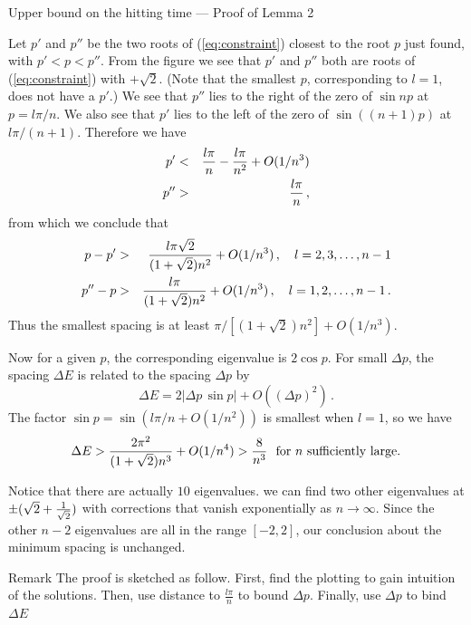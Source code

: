 \documentclass{beamer}
\newcommand{\<}{\langle}
\renewcommand{\>}{\rangle}
\newcommand{\be}{\begin{equation}}
\newcommand{\ee}{\end{equation}}
\newcommand{\bea}{\begin{eqnarray}}
\newcommand{\eea}{\end{eqnarray}}
\begin{document}
\begin{frame}[allowframebreaks]{Upper bound on the hitting time --- Proof of Lemma 2}
\framebreak

Let $p'$ and $p''$ be the two roots of (\ref{eq:constraint}) closest to
the root $p$ just found, with $p' < p < p''$.  From the figure we see that
$p'$ and $p''$ both are roots of (\ref{eq:constraint}) with $+\sqrt2$.
(Note that the smallest $p$, corresponding to $l=1$, does not have a
$p'$.)   We see that $p''$ lies to the right of the zero of $\sin np$ at
$p=l\pi/n$.  We also see that $p'$ lies to the left of the zero of
$\sin((n+1)p)$ at $l \pi/(n+1)$.  Therefore we have
\bea
  p'  &<& {l \pi \over n} - {l \pi \over n^2} + O(1/n^3) \\
  p'' &>& {l \pi \over n}
\,,
\eea
from which we conclude that
\bea
  p-p'  &>& {l \pi \sqrt 2 \over (1+\sqrt2)n^2} + O(1/n^3) 
            \,, \quad l=2,3,\ldots,n-1 \\
  p''-p &>& {l \pi \over (1+\sqrt2)n^2} + O(1/n^3)
            \,, \quad l=1,2,\ldots,n-1
\,.
\eea
Thus the smallest spacing is at least $\pi/[(1+\sqrt2)n^2] + O(1/n^3)$.

Now for a given $p$, the corresponding eigenvalue is $2\cos p$.  For small
$\Delta p$, the spacing $\Delta E$ is related to the spacing $\Delta p$ by
\be
  \Delta E = 2 |\Delta p \, \sin p| + O\left((\Delta p)^2\right)
\,.
\ee
The factor $\sin p = \sin(l\pi/n + O (1/n^2))$ is smallest when $l=1$, so
we have
\be
  \Delta E > {2 \pi^2 \over (1+\sqrt 2) n^3} + O(1/n^4) > {8 \over n^3}
  \textrm{~ for $n$ sufficiently large.}
\ee

\framebreak


Notice that there are actually $10$ eigenvalues.
we can find two other eigenvalues at $\pm(\sqrt 2+{1 \over \sqrt 2})$ with
corrections that vanish exponentially as $n\to\infty$.  Since the other
$n-2$ eigenvalues are all in the range $[-2,2]$, our conclusion about the
minimum spacing is unchanged.

\begin{alertblock}{Remark}
The proof is sketched as follow. First, find the plotting to gain intuition of the solutions. Then, use distance to $\frac{l\pi}{n}$ to bound $\Delta p$. Finally, use $\Delta p$ to bind $\Delta E$
\end{alertblock}

\end{frame}

\end{document}
